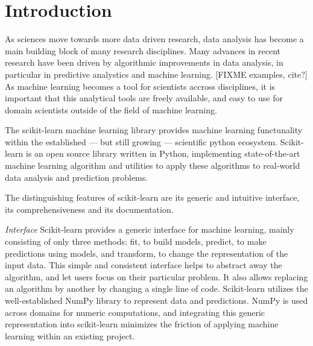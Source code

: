 




\setcounter{section}{0}
\section{Introduction}
As sciences move towards more data driven research, data analysis has
become a main building block of many research disciplines.
Many advances in recent research have been driven by algorithmic improvements
in data analysis, in particular in predictive analystics and machine learning.
[FIXME examples, cite?]
As machine learning becomes a tool for scientists accross disciplines, it is
important that this analytical tools are freely available, and easy to use for
domain scientists outside of the field of machine learning.


The scikit-learn machine learning library provides machine learning functunality
within the established --- but still growing --- scientific python ecosystem.
Scikit-learn is an open source library written in Python, implementing state-of-the-art
machine learning algorithm and utilities to apply these algorithms to real-world
data analysis and prediction problems.

The distinguishing features of scikit-learn are its generic and intuitive
interface, its comprehensiveness and its documentation.

\emph{Interface} Scikit-learn provides a generic interface for machine learning, mainly consisting
of only three methods: fit, to build models, predict, to make predictions using models,
and transform, to change the representation of the input data.
This simple and consistent interface helps to abstract away the algorithm, and let
users focus on their particular problem. It also allows replacing an algorithm by another
by changing a single line of code.
Scikit-learn utilizes the well-established NumPy library to represent data and predictions.
NumPy is used across domains for numeric computations, and integrating this generic
representation into scikit-learn minimizes the friction of applying machine learning
within an existing project.

